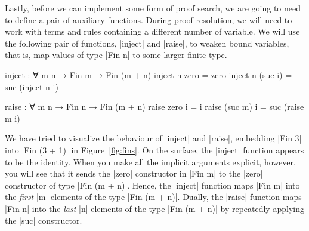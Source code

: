 \documentclass[preprint]{sigplanconf}
\begin{document}
Lastly, before we can implement some form of proof search, we are
going to need to define a pair of auxiliary functions. During proof
resolution, we will need to work with terms and rules containing a
different number of variable. We will use the following pair of
functions, |inject| and |raise|, to weaken bound variables, that is,
map values of type |Fin n| to some larger finite type.
\begin{code}
  inject : ∀ {m} n → Fin m → Fin (m + n)
  inject n  zero    = zero
  inject n (suc i)  = suc (inject n i)

  raise : ∀ m {n} → Fin n → Fin (m + n)
  raise  zero   i  = i
  raise (suc m) i  = suc (raise m i)
\end{code}
We have tried to visualize the behaviour of |inject| and |raise|,
embedding |Fin 3| into |Fin (3 + 1)| in Figure~\ref{fig:fins}. On the
surface, the |inject| function appears to be the identity. When you
make all the implicit arguments explicit, however, you will see that
it sends the |zero| constructor in |Fin m| to the |zero| constructor
of type |Fin (m + n)|. Hence, the |inject| function maps |Fin m| into the
\emph{first} |m| elements of the type |Fin (m + n)|. Dually, the
|raise| function maps |Fin n| into the \emph{last} |n| elements of the
type |Fin (m + n)| by repeatedly applying the |suc| constructor.
\end{document}
